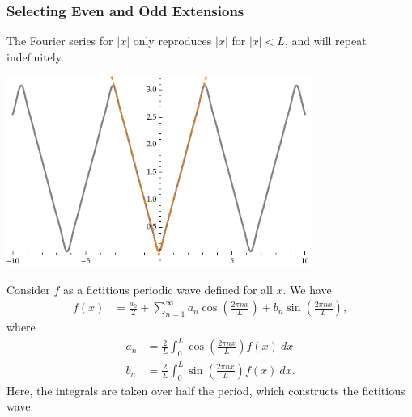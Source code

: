 \documentclass[10pt]{mypackage}
\begin{document}
\subsubsection{Selecting Even and Odd Extensions}%
The Fourier series for $\left\vert x \right\vert$ only reproduces $\left\vert x \right\vert$ for $\left\vert x \right\vert < L$, and will repeat indefinitely.
\begin{center}
  \includegraphics[width=10cm]{images/fourier_series_abs_x_extended.pdf}
\end{center}
Consider $f$ as a fictitious periodic wave defined for all $x$. We have
\begin{align*}
  f(x) &= \frac{a_0}{2} + \sum_{n=1}^{\infty}a_n\cos\left(\frac{2\pi n x}{L}\right) + b_n\sin\left(\frac{2\pi n x}{L}\right),
\end{align*}
where
\begin{align*}
  a_n &= \frac{2}{L} \int_{0}^{L} \cos\left(\frac{2\pi n x}{L}\right)f(x)\:dx\\
  b_n &= \frac{2}{L} \int_{0}^{L} \sin\left(\frac{2\pi n x}{L}\right)f(x)\:dx.
\end{align*}
Here, the integrals are taken over half the period, which constructs the fictitious wave.\newline
\end{document}
